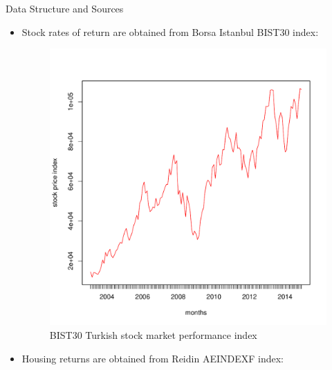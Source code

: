 \documentclass{beamer}
\begin{document}
\begin{frame}[allowframebreaks]{Data Structure and Sources}
  \begin{itemize}

	\item Stock rates of return are obtained from Borsa Istanbul BIST30 index:

\begin{figure}
	\centering
	\includegraphics[scale=0.25]{figs/bist.pdf}
	\caption{BIST30 Turkish stock market performance index}
\end{figure}

\framebreak


	\item Housing returns are obtained from Reidin AEINDEXF index:


\end{itemize}
\end{frame}
\end{document}
